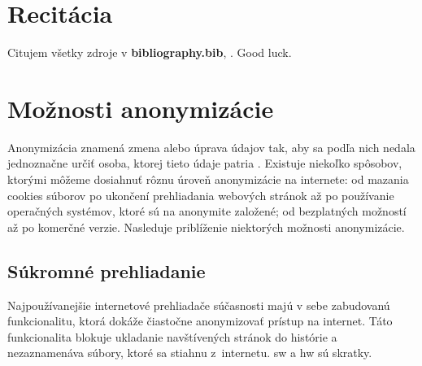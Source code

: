 \section{Recitácia}

Citujem všetky zdroje v \textbf{bibliography.bib}, \cite{t00, t01, t02, t03, kniha, kniha2, kniha3, small, big, cs, koll, kap, tug, knuth, zbornik, prispevok}. \newline Good luck.
\section{Možnosti anonymizácie}
\noindent Anonymizácia znamená zmena alebo úprava údajov tak, aby sa podľa nich nedala jednoznačne určiť osoba, ktorej tieto údaje patria \cite{t01}. Existuje niekoľko spôsobov, ktorými môžeme dosiahnuť rôznu úroveň anonymizácie na internete: od mazania cookies súborov po ukončení prehliadania webových stránok až po používanie operačných systémov, ktoré sú na anonymite založené; od bezplatných možností až po komerčné verzie.  
\newline Nasleduje priblíženie niektorých možnosti anonymizácie.

\subsection{Súkromné prehliadanie}
\noindent Najpoužívanejšie internetové prehliadače súčasnosti majú v sebe zabudovanú funkcionalitu, ktorá dokáže čiastočne anonymizovať prístup na internet. Táto funkcionalita blokuje ukladanie navštívených stránok do histórie a nezaznamenáva súbory, ktoré sa stiahnu z~internetu. \acrshort{sw} a \acrlong{hw} sú skratky.

